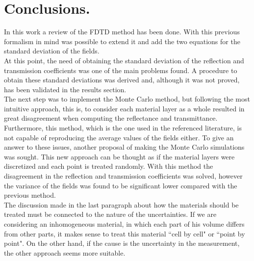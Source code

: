 \documentclass[12pt, oneside]{book}
\begin{document}
\chapter{Conclusions.}
In this work a review of the FDTD method has been done. With this previous formalism in mind was possible to extend it and add the two equations for the standard deviation of the fields. \\
\indent At this point, the need of obtaining the standard deviation of the reflection and transmission coefficients was one of the main problems found. A procedure to obtain these standard deviations was derived and, although it was not proved, has been validated in the results section. \\
\indent The next step was to implement the Monte Carlo method, but following the most intuitive approach, this is, to consider each material layer as a whole resulted in great disagreement when computing the reflectance and transmittance. Furthermore, this method, which is the one used in the referenced literature, is not capable of reproducing the average values of the fields either. To give an answer to these issues, another proposal of making the Monte Carlo simulations was sought. This new approach can be thought as if the material layers were discretized and each point is treated randomly. With this method the disagreement in the reflection and transmission coefficients was solved, however the variance of the fields was found to be significant lower compared with the previous method. \\
\indent The discussion made in the last paragraph about how the materials should be treated must be connected to the nature of the uncertainties. If we are considering an inhomogeneous  material, in which each part of his volume differs from other parts, it makes sense to treat this material ``cell by cell" or ``point by point". On the other hand, if the cause is the uncertainty in the measurement, the other approach seems more suitable. \\









\end{document}
